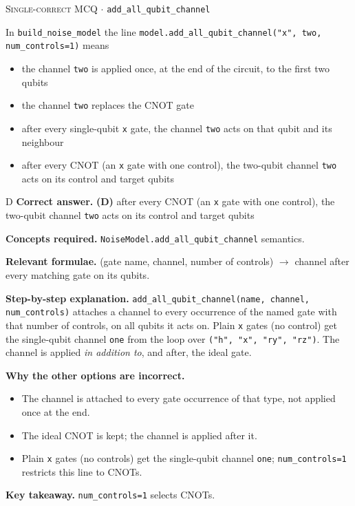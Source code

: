 \documentclass[11pt,a4paper]{article}
\newcommand{\optlabel}[1]{\textbf{(#1)}}
\newcommand{\correctlabel}[1]{\textcolor{okgreen}{\textbf{(#1)}\,\ding{51}}}
\newenvironment{qitem}[1]{\begin{list}{}{\setlength{\leftmargin}{3.3em}\setlength{\labelwidth}{3.1em}%
  \setlength{\labelsep}{0.2em}\setlength{\topsep}{3pt}\setlength{\parsep}{3pt}}\item[\textbf{Q.#1}\hfill]}{\end{list}}
\newcommand{\qsep}{\par\vspace{2pt}{\color{black!15}\hrule}\vspace{4pt}}
\newcommand{\qmeta}[2]{{\footnotesize\color{black!60}\textsc{#1} \;$\cdot$\; #2}\par}
\begin{document}
\begin{qitem}{54}
\qmeta{Single-correct MCQ}{\texttt{add\_all\_qubit\_channel}}
In \texttt{build\_noise\_model} the line \texttt{model.add\_all\_qubit\_channel("x", two, num\_controls=1)} means
\begin{itemize}[leftmargin=2.6em, labelsep=0.4em, itemsep=2pt, topsep=3pt]
\item[\optlabel{A}] the channel \texttt{two} is applied once, at the end of the circuit, to the first two qubits
\item[\optlabel{B}] the channel \texttt{two} replaces the CNOT gate
\item[\optlabel{C}] after every single-qubit \texttt{x} gate, the channel \texttt{two} acts on that qubit and its neighbour
\item[\correctlabel{D}] after every CNOT (an \texttt{x} gate with one control), the two-qubit channel \texttt{two} acts on its control and target qubits
\end{itemize}
\end{qitem}
\begin{solbox}{D}
\textbf{\color{brand}Correct answer.} \textcolor{okgreen}{\textbf{(D)}} after every CNOT (an \texttt{x} gate with one control), the two-qubit channel \texttt{two} acts on its control and target qubits

\textbf{\color{brand}Concepts required.} \texttt{NoiseModel.add\_all\_qubit\_channel} semantics.

\textbf{\color{brand}Relevant formulae.} (gate name, channel, number of controls) $\to$ channel after every matching gate on its qubits.

\textbf{\color{brand}Step-by-step explanation.} \texttt{add\_all\_qubit\_channel(name, channel, num\_controls)} attaches a channel to every occurrence of the named gate with that number of controls, on all qubits it
acts on. Plain \texttt{x} gates (no control) get the single-qubit channel \texttt{one} from the loop over \texttt{("h", "x", "ry", "rz")}. The channel is applied
\emph{in addition to}, and after, the ideal gate.

\textbf{\color{brand}Why the other options are incorrect.}
\begin{itemize}[leftmargin=2.4em, itemsep=1pt, topsep=2pt]
\item[\textbf{(A)}] The channel is attached to every gate occurrence of that type, not applied once at the end.
\item[\textbf{(B)}] The ideal CNOT is kept; the channel is applied after it.
\item[\textbf{(C)}] Plain \texttt{x} gates (no controls) get the single-qubit channel \texttt{one}; \texttt{num\_controls=1} restricts this line to CNOTs.
\end{itemize}
\textbf{\color{brand}Key takeaway.} \texttt{num\_controls=1} selects CNOTs.
\end{solbox}
\qsep
\end{document}
